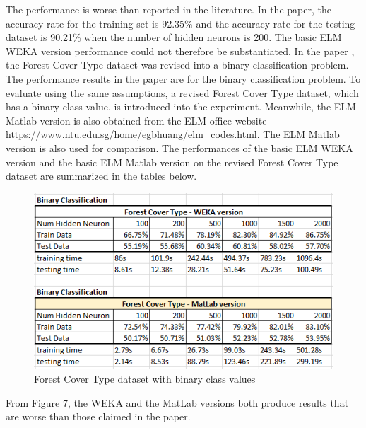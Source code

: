 \documentclass[a4paper, 14pt]{extarticle}
\begin{document}
The performance is worse than reported in the literature. In the paper\cite{G.B.Huang-ICNN}, the accuracy rate for the training set is 92.35\% and the accuracy rate for the testing dataset is 90.21\% when the number of hidden neurons is 200.  The basic ELM WEKA version performance could not therefore be substantiated. In the paper \cite{G.B.Huang-ICNN}, the Forest Cover Type dataset was revised into a binary classification problem. The performance results in the paper \cite{G.B.Huang-ICNN} are for the binary classification problem. To evaluate using the same assumptions, a revised Forest Cover Type dataset, which has a binary class value, is introduced into the experiment. Meanwhile, the ELM Matlab version is also obtained from the ELM office website \url{https://www.ntu.edu.sg/home/egbhuang/elm_codes.html}. The ELM Matlab version is also used for comparison. The performances of the basic ELM WEKA version and the basic ELM Matlab version on the revised Forest Cover Type dataset are summarized in the tables below.
\begin{figure}[H]
\centering
\includegraphics[width=\textwidth]{6.png}
\caption{\label{fig:trainingvstesting}Forest Cover Type dataset with binary class values}
\end{figure}
From Figure 7, the WEKA and the MatLab versions both
produce results that are worse than those claimed in the paper\cite{G.B.Huang-ICNN}.\newline 
\end{document}
